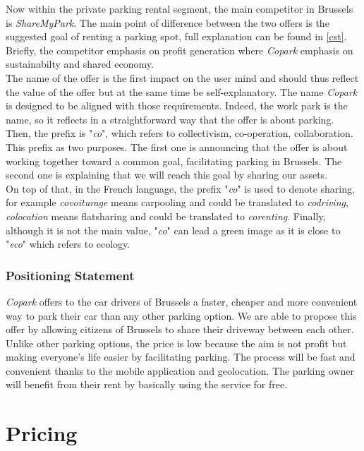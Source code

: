 \documentclass[12pt,a4paper,oneside]{book}
\newcommand{\bp}{\textit{Copark }}
\begin{document}
Now within the private parking rental segment, the main competitor in Brussels is \textit{ShareMyPark}. The main point of difference between the two offers is the suggested goal of renting a parking spot, full explanation can be found in \autoref{cst}. Briefly, the competitor emphasis on profit generation where \bp emphasis on sustainabilty and shared economy.\\

The name of the offer is the first impact on the user mind and should thus reflect the value of the offer but at the same time be self-explanatory. The name \bp is designed to be aligned with those requirements. Indeed, the work park is the name, so it reflects in a straightforward way that the offer is about parking. Then, the prefix is "\textit{co}", which refers to collectivism, co-operation, collaboration. This prefix as two purposes. The first one is announcing that the offer is about working together toward a common goal, facilitating parking in Brussels. The second one is explaining that we will reach this goal by sharing our assets.\\
On top of that, in the French language, the prefix "\textit{co}" is used to denote sharing, for example \textit{covoiturage} means carpooling and could be translated to \textit{codriving}, \textit{colocation} means flatsharing and could be translated to \textit{corenting}. Finally, although it is not the main value, "\textit{co}" can lead a green image as it is close to "\textit{eco}" which refers to ecology.

\subsubsection{Positioning Statement}

\bp offers to the car drivers of Brussels a faster, cheaper and more convenient way to park their car than any other parking option. We are able to propose this offer by allowing citizens of Brussels to share their driveway between each other. Unlike other parking options, the price is low because the aim is not profit but making everyone's life easier by facilitating parking. The process will be fast and convenient thanks to the mobile application and geolocation. The parking owner will benefit from their rent by basically using the service for free. 

\section{Pricing}
\label{priceana}
\end{document}
